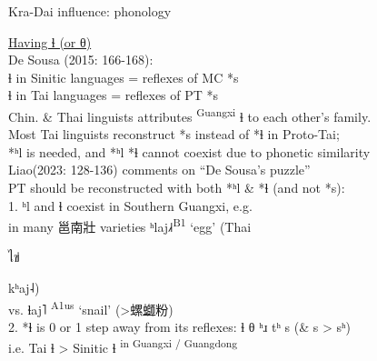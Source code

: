 \documentclass{beamer}
\begin{document}
\begin{frame}[fragile]{Kra-Dai influence: phonology}

\underline{Having ɬ (or θ)}\\
    De Sousa (2015: 166-168):\\ ɬ in Sinitic languages = reflexes of MC *s\\ ɬ in Tai languages = reflexes of PT *s\\ Chin. \& Thai linguists attributes \textsuperscript{Guangxi} ɬ to each other's family.\\
    \medskip
    {\footnotesize Most Tai linguists reconstruct *s instead of *ɬ in Proto-Tai;\\ *ʰl is needed, and *ʰl *ɬ cannot coexist due to phonetic similarity}\\
    \medskip
    Liao(2023: 128-136) comments on \enquote{De Sousa's puzzle}\\
    PT should be reconstructed with both *ʰl \& *ɬ (and not *s):\\
    1. ʰl and ɬ coexist in Southern Guangxi, e.g.\\ in many 邕南壯 varieties ʰlaj˩˧\textsuperscript{B1} \enquote*{egg} (Thai \begin{thai}ไข่\end{thai} kʰaj˨)\\ vs. ɬaj˥ \textsuperscript{A1us} \enquote*{snail} (>螺\underline{螄}粉)\\
    2. *ɬ is 0 or 1 step away from its reflexes: ɬ θ ʰɹ tʰ s {\scriptsize(\& s > sʰ)}\\
    \medskip
    i.e. Tai ɬ > Sinitic ɬ \textsuperscript{in Guangxi / Guangdong} 

\end{frame}
\end{document}
